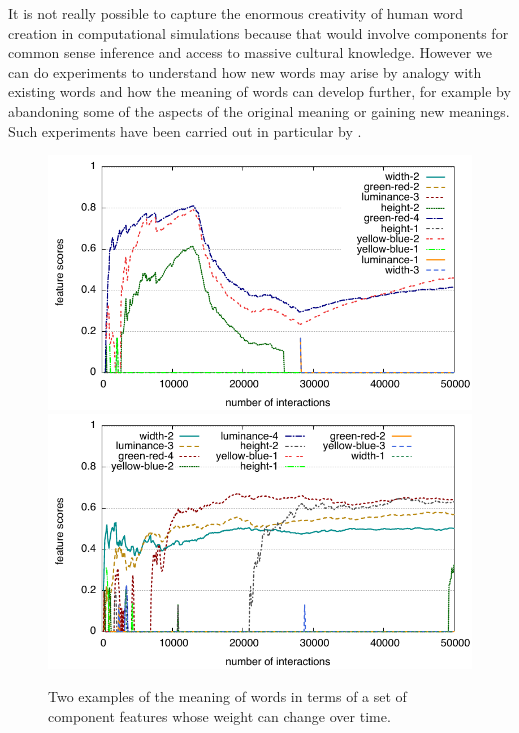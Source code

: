 It is not really possible to capture the enormous creativity of human word creation in computational simulations 
because that would involve components for common sense inference and access to massive cultural knowledge. 
However we can do experiments to understand how new words may arise by analogy with existing words 
and how the meaning of words can develop further, for example by abandoning some of the aspects of 
the original meaning or gaining new meanings. Such experiments have 
been carried out in particular by \cite{Wellens:2008}. 


\begin{figure}
\begin{center}
\includegraphics[width=\textwidth]{chap12/figs/attribute-scores-4.pdf}
\includegraphics[width=\textwidth]{chap12/figs/dog-meaning.pdf}
\end{center}
\caption{Two examples of the meaning of words in terms of a set of component features whose weight can change over time.}
\label{fig:weightchange}
\end{figure}

